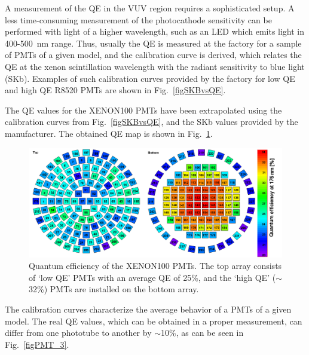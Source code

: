 A measurement of the QE in the VUV region requires a sophisticated setup. A less time-consuming measurement of the photocathode sensitivity can be performed with light of a higher wavelength, such as an LED which emits light in 400-500~nm range.
Thus, usually the QE is measured at the factory for a sample of PMTs of a given model, and the calibration curve is derived, which relates the QE at the xenon scintillation wavelength with the radiant sensitivity to blue light (SKb). Examples of such calibration curves provided by the factory for low QE and high QE R8520 PMTs are shown in Fig.~\ref{figSKBvsQE}.

The QE values for the XENON100 PMTs have been extrapolated using the calibration curves from Fig.~\ref{figSKBvsQE}, and the SKb values provided by the manufacturer. The obtained QE map is shown in Fig.~\ref{figQEmap}.




\begin{figure}[!h]
\centering
\includegraphics[width=1.0\linewidth]{plots/QE/QEmap.png}
\caption[Quantum efficiency of the XENON100 PMTs]{Quantum efficiency of the XENON100 PMTs. The top array consists of `low QE' PMTs with an average QE of 25\%, and the `high QE' ($\sim$32\%) PMTs are installed on the bottom array.}
\label{figQEmap}
\end{figure}

The calibration curves characterize the average behavior of a PMTs of a given model. The real QE values, which can be obtained in a proper measurement, can differ from one phototube to another  by $\sim$10\%, as can be seen in Fig.~\ref{figPMT_3}. 

